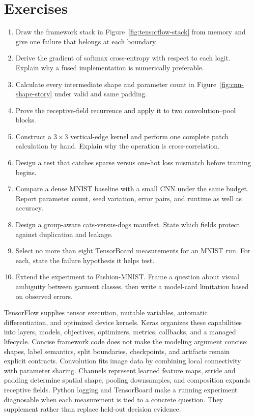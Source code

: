 \section{Exercises}
\begin{enumerate}
  \item Draw the framework stack in Figure~\ref{fig:tensorflow-stack} from
  memory and give one failure that belongs at each boundary.
  \item Derive the gradient of softmax cross-entropy with respect to each
  logit. Explain why a fused implementation is numerically preferable.
  \item Calculate every intermediate shape and parameter count in
  Figure~\ref{fig:cnn-shape-story} under valid and same padding.
  \item Prove the receptive-field recurrence and apply it to two
  convolution--pool blocks.
  \item Construct a $3\times3$ vertical-edge kernel and perform one complete
  patch calculation by hand. Explain why the operation is cross-correlation.
  \item Design a test that catches sparse versus one-hot loss mismatch before
  training begins.
  \item Compare a dense MNIST baseline with a small CNN under the same budget.
  Report parameter count, seed variation, error pairs, and runtime as well as
  accuracy.
  \item Design a group-aware cats-versus-dogs manifest. State which fields
  protect against duplication and leakage.
  \item Select no more than eight TensorBoard measurements for an MNIST run.
  For each, state the failure hypothesis it helps test.
  \item Extend the experiment to Fashion-MNIST. Frame a question about visual
  ambiguity between garment classes, then write a model-card limitation based
  on observed errors.
\end{enumerate}

\begin{chapterreview}
TensorFlow supplies tensor execution, mutable variables, automatic
differentiation, and optimized device kernels. Keras organizes these
capabilities into layers, models, objectives, optimizers, metrics, callbacks,
and a managed lifecycle. Concise framework code does not make the modeling
argument concise: shapes, label semantics, split boundaries, checkpoints, and
artifacts remain explicit contracts. Convolution fits image data by combining
local connectivity with parameter sharing. Channels represent learned feature
maps, stride and padding determine spatial shape, pooling downsamples, and
composition expands receptive fields. Python logging and TensorBoard make a
running experiment diagnosable when each measurement is tied to a concrete
question. They supplement rather than replace held-out decision evidence.
\end{chapterreview}

